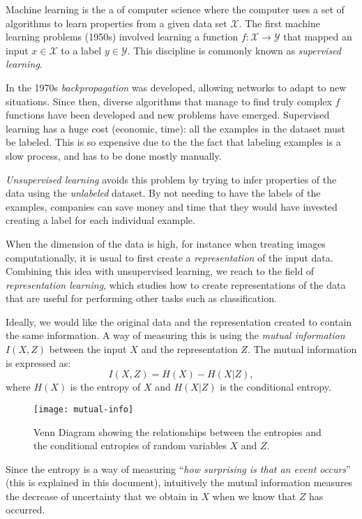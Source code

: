 
Machine learning is the a of computer science where the computer uses a set of algorithms to learn properties from a given data set $\mathcal X$. The first machine learning problems (1950s) involved learning a function $f: \mathcal X \to \mathcal Y$ that mapped an input $x \in \mathcal X$ to a label $y \in \mathcal Y$. This discipline is commonly known as \emph{supervised learning}.

In the 1970s \emph{backpropagation} was developed, allowing networks to adapt to new situations. Since then, diverse algorithms that manage to find truly complex $f$ functions have been developed and new problems have emerged. Supervised learning has a huge cost (economic, time): all the examples in the dataset must be labeled. This is so expensive due to the  the fact that labeling examples is a slow process, and has to be done mostly manually. 

\emph{Unsupervised learning} avoids this problem by trying to infer properties of the data using the \emph{unlabeled} dataset. By not needing to have the labels of the examples, companies can save money and time that they would have invested creating a label for each individual example.

When the dimension of the data is high, for instance when treating images computationally, it is usual to first create a \emph{representation} of the input data. Combining this idea with unsupervised learning, we reach to the field of \emph{representation learning}, which studies how to create representations of the data that are useful for performing other tasks such as classification.

Ideally, we would like the original data and the representation created to contain the same information. A way of measuring this is using the \emph{mutual information} $I(X,Z)$ between the input $X$ and the representation $Z$. The mutual information is expressed as:
\[
I(X,Z) = H(X) - H(X|Z),
\]
where $H(X)$ is the entropy of $X$ and $H(X|Z)$ is the conditional entropy.

\begin{figure}[H]
    \centering
    \texttt{[image: mutual-info]}
    \caption{Venn Diagram showing the relationships between the entropies and the conditional entropies of random variables $X$ and $Z$.}
\end{figure}

Since the entropy is a way of measuring ``\emph{how surprising is that an event occurs}'' (this is explained in this document), intuitively the mutual information measures the decrease of uncertainty that we obtain in $X$ when we know that $Z$ has occurred.

